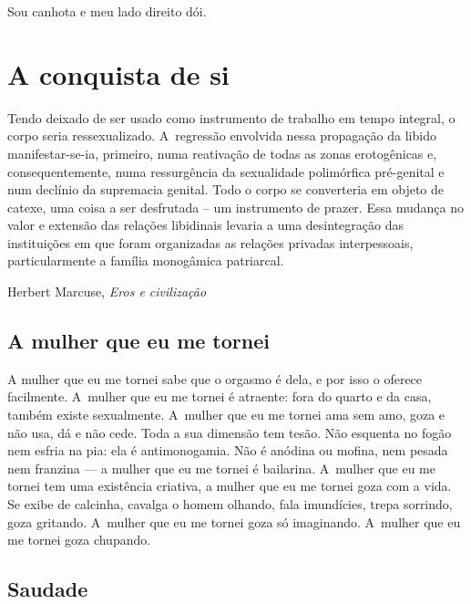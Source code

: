 \epigraph{Sou canhota e meu lado direito dói.}{}


\part{A conquista de si}


\epigraph{Tendo deixado de ser usado como instrumento de trabalho em tempo integral, o corpo seria ressexualizado. A~regressão envolvida nessa propagação da libido manifestar-se-ia, primeiro, numa reativação de todas as zonas erotogênicas e, consequentemente, numa ressurgência da sexualidade polimórfica pré-genital e num declínio da supremacia genital. Todo o corpo se converteria em objeto de catexe, uma coisa a ser desfrutada – um instrumento de prazer. Essa mudança no valor e extensão das relações libidinais levaria a uma desintegração das instituições em que foram organizadas as relações privadas interpessoais, particularmente a família monogâmica patriarcal.}{Herbert Marcuse, \emph{Eros e civilização}}




\epigraph{}{} 

\chapter{A mulher que eu me tornei}

A mulher que eu me tornei sabe que o orgasmo é dela, e por isso o
oferece facilmente. A~mulher que eu me tornei é atraente: fora do quarto
e da casa, também existe sexualmente. A~mulher que eu me tornei ama sem
amo, goza e não usa, dá e não cede.{} Toda a sua dimensão tem
tesão.{} Não esquenta no fogão nem esfria na pia: ela é
antimonogamia. Não é anódina ou mofina, nem pesada nem franzina --- a
mulher que eu me tornei é bailarina. A~mulher que eu me tornei tem uma
existência criativa, a mulher que eu me tornei goza com a vida. Se exibe
de calcinha, cavalga o homem olhando, fala imundícies, trepa sorrindo,
goza gritando. A~mulher que eu me tornei goza só imaginando. A~mulher
que eu me tornei goza chupando.

\chapter{Saudade}

